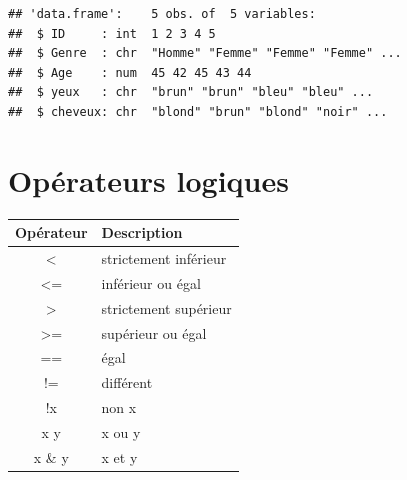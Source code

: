 \documentclass[
]{book}
\newenvironment{Shaded}{\begin{snugshade}}{\end{snugshade}}
\newcommand{\FunctionTok}[1]{\textcolor[rgb]{0.13,0.29,0.53}{\textbf{#1}}}
\newcommand{\NormalTok}[1]{#1}
\newcommand{\OtherTok}[1]{\textcolor[rgb]{0.56,0.35,0.01}{#1}}
\newcommand{\SpecialCharTok}[1]{\textcolor[rgb]{0.81,0.36,0.00}{\textbf{#1}}}
\newcommand{\StringTok}[1]{\textcolor[rgb]{0.31,0.60,0.02}{#1}}
\begin{document}
\begin{Shaded}
\end{Shaded}

\begin{verbatim}
## 'data.frame':    5 obs. of  5 variables:
##  $ ID     : int  1 2 3 4 5
##  $ Genre  : chr  "Homme" "Femme" "Femme" "Femme" ...
##  $ Age    : num  45 42 45 43 44
##  $ yeux   : chr  "brun" "brun" "bleu" "bleu" ...
##  $ cheveux: chr  "blond" "brun" "blond" "noir" ...
\end{verbatim}

\section{Opérateurs logiques}\label{opuxe9rateurs-logiques}

\begin{longtable}[]{@{}cl@{}}
\toprule\noalign{}
Opérateur & Description \\
\midrule\noalign{}
\endhead
\bottomrule\noalign{}
\endlastfoot
\textless{} & strictement inférieur \\
\textless= & inférieur ou égal \\
\textgreater{} & strictement supérieur \\
\textgreater= & supérieur ou égal \\
== & égal \\
!= & différent \\
!x & non x \\
x \textbar{} y & x ou y \\
x \& y & x et y \\
\end{longtable}
\end{document}
